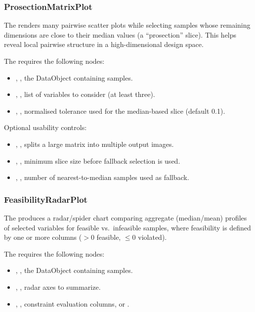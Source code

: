 \subsubsection{ProsectionMatrixPlot}
The   renders many pairwise scatter plots while selecting samples whose
remaining dimensions are close to their median values (a ``prosection'' slice).
This helps reveal local pairwise structure in a high-dimensional design space.

The   requires the following nodes:
\begin{itemize}
  \item {}, , the DataObject containing samples.
  \item {}, , list of variables to consider (at least three).
  \item {}, , normalised tolerance used for the median-based slice (default 0.1).
\end{itemize}

Optional usability controls:
\begin{itemize}
  \item {}, , splits a large matrix into multiple output images.
  \item {}, , minimum slice size before fallback selection is used.
  \item {}, , number of nearest-to-median samples used as fallback.
\end{itemize}

\subsubsection{FeasibilityRadarPlot}
The   produces a radar/spider chart comparing aggregate (median/mean)
profiles of selected variables for feasible vs.\ infeasible samples, where feasibility is defined by one or more
 columns ($> 0$ feasible, $\le 0$ violated).

The   requires the following nodes:
\begin{itemize}
  \item {}, , the DataObject containing samples.
  \item {}, , radar axes to summarize.
  \item {}, , constraint evaluation columns, or .
\end{itemize}

